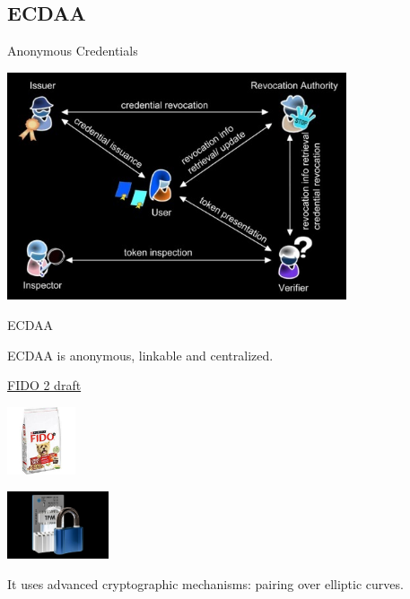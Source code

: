 \documentclass[aspectratio=43]{beamer}
\begin{document}
\subsection{ECDAA}
\begin{frame}{Anonymous Credentials}
 
 
 \begin{center}
 \includegraphics[width=10cm]{images/AnonymousCredentials.jpg}
 \end{center}


 
\end{frame}
\begin{frame}{ECDAA}


ECDAA is anonymous, linkable and centralized.


{\cyan \href{https://fidoalliance.org/specs/common-specs/fido-ecdaa-algorithm-v2.1-rd-20210525.pdf}{FIDO 2 draft}}

 \begin{center}
 \includegraphics[width=2cm]{images/fido.jpg}
 \end{center}

{}
 \begin{center}
 \includegraphics[width=3cm]{images/tpm.jpg}
 \end{center}

It uses advanced cryptographic mechanisms: pairing over elliptic curves.


\end{frame}
\end{document}
